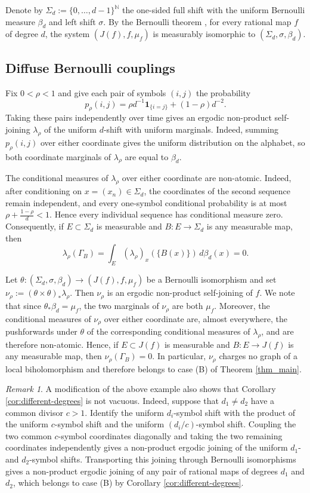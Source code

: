 \documentclass[11pt]{amsart}
\numberwithin{equation}{section}
\theoremstyle{plain}
\theoremstyle{definition}
\theoremstyle{remark}
\newtheorem{rmk}[thm]{Remark}
\begin{document}
Denote by
$\Sigma_d:=\{0,\ldots,d-1\}^{\mathbb N}$
the one-sided full shift with the uniform Bernoulli measure
$\beta_d$ and left shift $\sigma$. By the Bernoulli theorem \cite{HeicklenHoffman, ManeBernoulli}, 
for every rational map $f$ of
degree $d$, the system $(J(f),f,\mu_f)$ is measurably isomorphic to
$(\Sigma_d,\sigma,\beta_d)$.


\subsection{Diffuse Bernoulli couplings}
Fix $0<\rho<1$ and give each pair of symbols $(i,j)$ the probability
$$
p_\rho(i,j)
=
\rho d^{-1}\mathbf 1_{\{i=j\}}
+
(1-\rho)d^{-2}.
$$
Taking these pairs independently over time gives an ergodic
non-product self-joining $\lambda_\rho$ of the uniform $d$-shift
with uniform marginals. Indeed, summing $p_\rho(i,j)$ over either coordinate gives the
uniform distribution on the alphabet, so both coordinate marginals
of $\lambda_\rho$ are
equal to $\beta_d$.

The conditional measures of $\lambda_\rho$ over either coordinate
are non-atomic. Indeed, after conditioning on
$x=(x_n)\in\Sigma_d$, the coordinates of the second sequence remain
independent, and every one-symbol conditional probability is at most
$
\rho+\frac{1-\rho}{d}<1.
$
Hence every individual sequence has conditional measure zero.
Consequently, if $E\subset\Sigma_d$ is measurable and
$B\colon E\to\Sigma_d$ is any measurable map, then
$$
\lambda_\rho(\Gamma_B)
=
\int_E
(\lambda_\rho)_x(\{B(x)\})\,d\beta_d(x)
=
0.
$$

Let
$\theta\colon(\Sigma_d,\sigma,\beta_d)\to(J(f),f,\mu_f)$
be a Bernoulli isomorphism and set
$
\nu_\rho:=
(\theta\times\theta)_*\lambda_\rho.
$
Then $\nu_\rho$ is an ergodic non-product self-joining of $f$. We note that since $\theta_*\beta_d=\mu_f$, the two marginals of $\nu_\rho$ are
both $\mu_f$.
Moreover, the conditional measures of $\nu_\rho$ over either
coordinate are, almost everywhere, the pushforwards under $\theta$
of the corresponding conditional measures of $\lambda_\rho$, and
are therefore non-atomic. Hence, if $E\subset J(f)$ is measurable
and $B\colon E\to J(f)$ is any measurable map, then
$
\nu_\rho(\Gamma_B)
=
0.
$
In particular, $\nu_\rho$ charges no graph of a local
biholomorphism and therefore belongs to case \textup{(B)} of
Theorem \ref{thm_main}.

\begin{rmk}\label{rmk:different-degrees-example}
A modification of the above example also shows that Corollary
\ref{cor:different-degrees} is not vacuous. Indeed, suppose that
$d_1\neq d_2$ have a common divisor $c>1$. Identify the uniform
$d_i$-symbol shift with the product of the uniform $c$-symbol shift
and the uniform $(d_i/c)$-symbol shift. Coupling the two common
$c$-symbol coordinates diagonally and taking the two remaining
coordinates independently gives a non-product ergodic joining of
the uniform $d_1$- and $d_2$-symbol shifts. Transporting this joining
through Bernoulli isomorphisms gives a non-product ergodic joining
of any pair of rational maps of degrees $d_1$ and $d_2$, which
belongs to case \textup{(B)} by Corollary
\ref{cor:different-degrees}.
\end{rmk}
\end{document}
